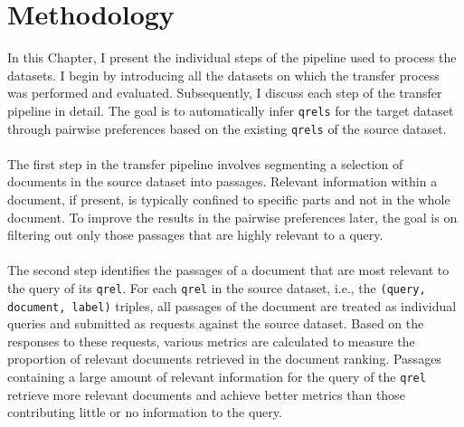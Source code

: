\chapter{Methodology}\label{methodology}

In this Chapter, I present the individual steps of the pipeline used to process the datasets. I begin by introducing all the datasets on which the transfer process was performed and evaluated. Subsequently, I discuss each step of the transfer pipeline in detail. The goal is to automatically infer \texttt{qrels} for the target dataset through pairwise preferences based on the existing \texttt{qrels} of the source dataset.
\\\\
The first step in the transfer pipeline involves segmenting a selection of documents in the source dataset into passages. Relevant information within a document, if present, is typically confined to specific parts and not in the whole document. To improve the results in the pairwise preferences later, the goal is on filtering out only those passages that are highly relevant to a query.
\\\\
The second step identifies the passages of a document that are most relevant to the query of its \texttt{qrel}. For each \texttt{qrel} in the source dataset, i.e., the \texttt{(query, document, label)} triples, all passages of the document are treated as individual queries and submitted as requests against the source dataset. Based on the responses to these requests, various metrics are calculated to measure the proportion of relevant documents retrieved in the document ranking. Passages containing a large amount of relevant information for the query of the \texttt{qrel} retrieve more relevant documents and achieve better metrics than those contributing little or no information to the query.

\pagebreak

